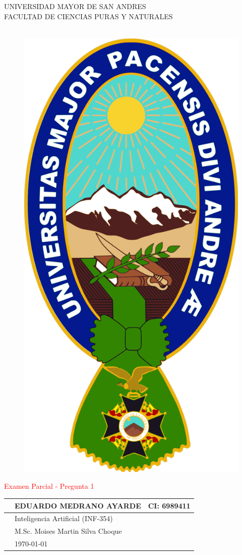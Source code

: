 
	\thispagestyle{empty}
	\begin{center}
		{\fontsize{20}{40}\selectfont UNIVERSIDAD MAYOR DE SAN ANDRES}\\
		\vspace*{0.2cm}
		{\fontsize{16}{32}\selectfont FACULTAD DE CIENCIAS PURAS Y NATURALES}\\
		{\fontsize{14}{28}\selectfont {\it CARRERA DE INFORMÁTICA}}\\
	\end{center}
	\begin{figure}[h]
	\centering
	\includegraphics[width=0.20\linewidth]{im/LOGO}
	\end{figure}
	\begin{center}
		
		
	{\textcolor{red}{\fontsize{24}{0}\selectfont Examen Parcial - Pregunta 1}}\\
	\end{center}
	\hspace*{0.1cm}
	\begin{center}
		\begin{tabular}{r l l}
			\toprule
			{\fontsize{16}{38}\selectfont {\bf Nombres:}} & {\fontsize{14}{38}\selectfont  EDUARDO MEDRANO AYARDE }&CI: 6989411 \\
			 
			
		 
		 
		 \toprule

			 
		 \toprule
			{\fontsize{16}{38}\selectfont {\bf Materia:}} & {\fontsize{14}{38}\selectfont Inteligencia Artificial (INF-354)}\\
			\toprule
			{\fontsize{16}{38}\selectfont {\bf Docente:}} & {\fontsize{14}{38}\selectfont M.Sc. Moises Martin Silva Choque}\\
			\toprule
			{\fontsize{16}{38}\selectfont {\bf Fecha:}} & {\fontsize{14}{38}\selectfont \today}\\
			\bottomrule
		\end{tabular}
	
	\end{center}
		
	
	 
	
	
	
	
